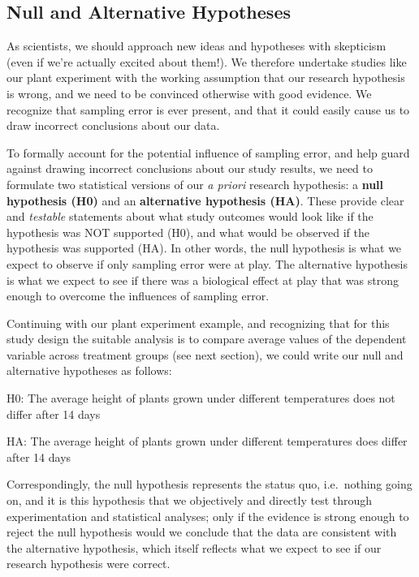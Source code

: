 \documentclass[
]{book}
\begin{document}
\hypertarget{null-and-alternative-hypotheses}{%
\subsection*{Null and Alternative Hypotheses}\label{null-and-alternative-hypotheses}}

As scientists, we should approach new ideas and hypotheses with skepticism (even if we're actually excited about them!). We therefore undertake studies like our plant experiment with the working assumption that our research hypothesis is wrong, and we need to be convinced otherwise with good evidence. We recognize that sampling error is ever present, and that it could easily cause us to draw incorrect conclusions about our data.

To formally account for the potential influence of sampling error, and help guard against drawing incorrect conclusions about our study results, we need to formulate two statistical versions of our \emph{a priori} research hypothesis: a \textbf{null hypothesis (H0)} and an \textbf{alternative hypothesis (HA)}. These provide clear and \emph{testable} statements about what study outcomes would look like if the hypothesis was NOT supported (H0), and what would be observed if the hypothesis was supported (HA). In other words, the null hypothesis is what we expect to observe if only sampling error were at play. The alternative hypothesis is what we expect to see if there was a biological effect at play that was strong enough to overcome the influences of sampling error.

Continuing with our plant experiment example, and recognizing that for this study design the suitable analysis is to compare average values of the dependent variable across treatment groups (see next section), we could write our null and alternative hypotheses as follows:

H0: The average height of plants grown under different temperatures does not differ after 14 days

HA: The average height of plants grown under different temperatures does differ after 14 days

Correspondingly, the null hypothesis represents the status quo, i.e.~nothing going on, and it is this hypothesis that we objectively and directly test through experimentation and statistical analyses; only if the evidence is strong enough to reject the null hypothesis would we conclude that the data are consistent with the alternative hypothesis, which itself reflects what we expect to see if our research hypothesis were correct.
\end{document}
